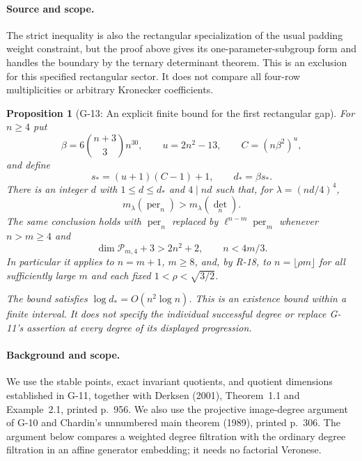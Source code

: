 \documentclass[11pt,a4paper]{article}
\newtheorem{proposition}{Proposition}
\theoremstyle{definition}\newtheorem{definition}{Definition}
\begin{document}
\paragraph{Source and scope.}
The strict inequality is also the rectangular specialization
of the usual padding weight constraint, but the proof above
gives its one-parameter-subgroup form and handles the
boundary by the ternary determinant theorem. This is an
exclusion for this specified rectangular sector. It does
not compare all four-row multiplicities or arbitrary
Kronecker coefficients.

\begin{proposition}[G-13: An explicit finite bound for the first rectangular gap]\label{G-13}
For $n\geq4$ put
\[
 \beta=6\binom{n+3}{3}n^{30},\qquad u=2n^2-13,\qquad
 C=(n\beta^2)^u,
\]
and define
\begin{equation}\label{G13:first-bound}
 s_*=(u+1)(C-1)+1,\qquad d_* = \beta s_*.
\end{equation}
There is an integer $d$ with $1\leq d\leq d_*$ and $4\mid nd$
such that, for $\lambda=(nd/4)^4$,
\[
 m_\lambda(\operatorname{per}_n)>m_\lambda(\det_n).
\]
The same conclusion holds with $\operatorname{per}_n$ replaced by
$\ell^{n-m}\operatorname{per}_m$ whenever $n>m\geq4$ and
\[
 \dim\mathcal P_{m,4}+3>2n^2+2,
 \qquad n<4m/3.
\]
In particular it applies to $n=m+1$, $m\geq8$, and, by R-18,
to $n=\lfloor\rho m\rfloor$ for all sufficiently large $m$
and each fixed $1<\rho<\sqrt{3/2}$.

The bound satisfies $\log d_*=O(n^2\log n)$. This is an
existence bound within a finite interval. It does not specify
the individual successful degree or replace G-11's assertion
at every degree of its displayed progression.
\end{proposition}

\paragraph{Background and scope.}
We use the stable points, exact invariant quotients, and quotient
dimensions established in G-11, together with Derksen (2001),
Theorem~1.1 and Example~2.1, printed p.~956. We also use the
projective image-degree argument of G-10 and Chardin's
unnumbered main theorem (1989), printed p.~306. The argument
below compares a weighted degree filtration with the ordinary
degree filtration in an affine generator embedding; it needs
no factorial Veronese.
\end{document}
